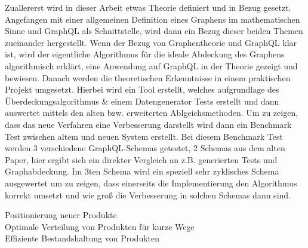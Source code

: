Zuallererst wird in dieser Arbeit etwas Theorie definiert und in Bezug gesetzt. Angefangen mit einer allgemeinen Definition
eines Graphens im mathematischen Sinne und GraphQL als Schnittstelle, wird dann ein Bezug dieser beiden Themen
zueinander hergestellt. Wenn der Bezug von Graphentheorie und GraphQL klar ist, wird der eigentliche Algorithmus für die
ideale Abdeckung des Graphens algorithmisch erklärt, eine Anwendung auf GraphQL in der Theorie gezeigt und bewiesen.
Danach werden die theoretischen Erkenntnisse in einem praktischen Projekt umgesetzt. Hierbei wird ein Tool erstellt,
welches aufgrundlage des Überdeckungsalgorithmus & einem Datengenerator Tests erstellt und dann auswertet mittels
den alten bzw. erweiterten Ablgeichsmethoden. Um zu zeigen, dass das neue Verfahren eine Verbesserung darstellt wird dann
ein Benchmark Test zwischen altem und neuen System erstellt. Bei diesem Benchmark Test werden 3 verschiedene
GraphQL-Schemas getestet, 2 Schemas aus dem alten Paper, hier ergibt sich ein direkter Vergleich an z.B. generierten Tests und
Graphabdeckung. Im 3ten Schema wird ein speziell sehr zyklisches Schema ausgewertet um zu zeigen, dass einerseits die Implementierung
den Algorithmus korrekt umsetzt und wie groß die Verbesserung in solchen Schemas dann sind.










































\begin{description}
    \item[Positionierung neuer Produkte]
    \item[Optimale Verteilung von Produkten für kurze Wege]
    \item[Effiziente Bestandshaltung von Produkten]
\end{description}


